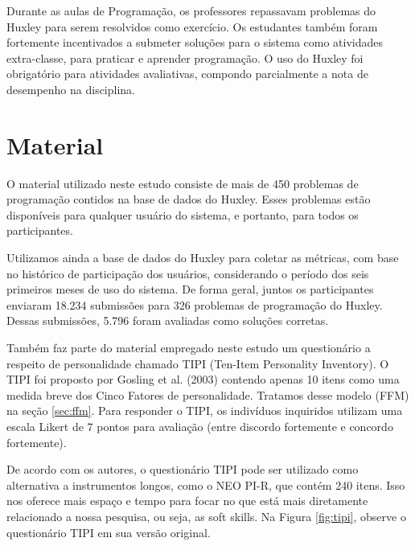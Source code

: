 Durante as aulas de Programação, os professores repassavam problemas do Huxley para serem resolvidos como exercício. Os estudantes também foram fortemente incentivados a submeter soluções para o sistema como atividades extra-classe, para praticar e aprender programação. O uso do Huxley foi obrigatório para atividades avaliativas, compondo parcialmente a nota de desempenho na disciplina.

\section{Material}
\label{sec:material}

O material utilizado neste estudo consiste de mais de 450 problemas de programação contidos na base de dados do Huxley. Esses problemas estão disponíveis para qualquer usuário do sistema, e portanto, para todos os participantes.

Utilizamos ainda a base de dados do Huxley para coletar as métricas, com base no histórico de participação dos usuários, considerando o período dos seis primeiros meses de uso do sistema. De forma geral, juntos os participantes enviaram 18.234 submissões para 326 problemas de programação do Huxley. Dessas submissões, 5.796 foram avaliadas como soluções corretas.


Também faz parte do material empregado neste estudo um questionário a respeito de personalidade chamado TIPI (Ten-Item Personality Inventory).
O TIPI foi proposto por Gosling et al. (2003)\nocite{gosling:03}
contendo apenas 10 itens como uma medida breve dos Cinco Fatores de personalidade.
Tratamos desse modelo (FFM) na seção \ref{sec:ffm}. Para responder o TIPI, os indivíduos inquiridos utilizam uma escala Likert de 7 pontos para avaliação (entre discordo fortemente e concordo fortemente).

De acordo com os autores, o questionário TIPI pode ser utilizado como alternativa a instrumentos longos, como o NEO PI-R, que contém 240 itens. Isso nos oferece mais espaço e tempo para focar no que está mais diretamente relacionado a nossa pesquisa, ou seja, as soft skills. Na Figura \ref{fig:tipi}, observe o questionário TIPI em sua versão original.

